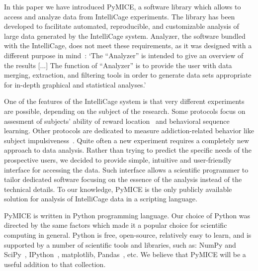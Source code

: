 In this paper we have introduced PyMICE, a software library which allows to access
and analyze data from IntelliCage experiments. 
%
The library has been developed to 
facilitate automated, reproducible, and customizable analysis of large data 
generated by the IntelliCage system. Analyzer, the software bundled with the 
IntelliCage, does not meet these requirements, as it was designed with a 
different purpose in mind~\cite{intelliCagePlusManual2011}:
`The ``Analyzer'' is intended to give an overview of the results [...]
The function of ``Analyzer'' is to provide the user with data merging,
extraction, and filtering tools in order to generate data sets appropriate for
in-depth graphical and statistical analyses.'

One of the features of the IntelliCage system is that very different
experiments are possible, depending on the subject of the research.
Some protocols focus on assesment of subjects' ability of reward
location~\cite{Knapska:2013dj} and behavioral sequence~\cite{Endo:2011bs}
learning. Other protocols are dedicated to measure addiction-related
behavior like subject impulsiveness~\cite{Radwanska:2012fd,Mijakowska:2015io}.
Quite often a new experiment requires a
completely new approach to data analysis. Rather than trying to predict the
specific needs of the prospective users, we decided to provide simple,
intuitive and user-friendly interface for accessing the data. Such interface
allows a scientific programmer to tailor dedicated software focusing on the
essence of the analysis instead of the technical details. To our knowledge,
PyMICE is the only publicly available solution for analysis of IntelliCage 
data in a scripting language.

PyMICE is written in Python programming language. Our choice of Python 
was directed by the same factors
which made it a popular choice for scientific computing in general. 
Python is free,
open-source, relatively easy to learn, and is supported by a number of
scientific tools and libraries, such as: NumPy and SciPy~\cite{Oliphant:2007ud},
IPython~\cite{Perez:2007wf}, matplotlib,
Pandas~\cite{mckinney-proc-scipy-2010}, etc.
We believe that PyMICE will be a useful addition to that collection.

